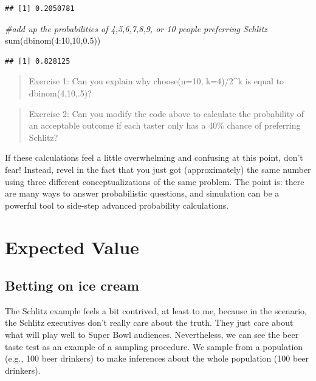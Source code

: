 \documentclass[
  openany]{book}
\newenvironment{Shaded}{\begin{snugshade}}{\end{snugshade}}
\newcommand{\CommentTok}[1]{\textcolor[rgb]{0.56,0.35,0.01}{\textit{#1}}}
\newcommand{\DecValTok}[1]{\textcolor[rgb]{0.00,0.00,0.81}{#1}}
\newcommand{\FloatTok}[1]{\textcolor[rgb]{0.00,0.00,0.81}{#1}}
\newcommand{\FunctionTok}[1]{\textcolor[rgb]{0.00,0.00,0.00}{#1}}
\newcommand{\NormalTok}[1]{#1}
\newcommand{\SpecialCharTok}[1]{\textcolor[rgb]{0.00,0.00,0.00}{#1}}
\begin{document}
\begin{verbatim}
## [1] 0.2050781
\end{verbatim}

\begin{Shaded}
\begin{Highlighting}[]
\CommentTok{\#add up the probabilities of 4,5,6,7,8,9, or 10 people preferring Schlitz}
\FunctionTok{sum}\NormalTok{(}\FunctionTok{dbinom}\NormalTok{(}\DecValTok{4}\SpecialCharTok{:}\DecValTok{10}\NormalTok{,}\DecValTok{10}\NormalTok{,}\FloatTok{0.5}\NormalTok{))}
\end{Highlighting}
\end{Shaded}

\begin{verbatim}
## [1] 0.828125
\end{verbatim}

\begin{quote}
Exercise 1: Can you explain why choose(n=10, k=4)/2\^{}k is equal to dbinom(4,10,.5)?
\end{quote}

\begin{quote}
Exercise 2: Can you modify the code above to calculate the probability of an acceptable outcome if each taster only has a 40\% chance of preferring Schlitz?
\end{quote}

If these calculations feel a little overwhelming and confusing at this point, don't fear! Instead, revel in the fact that you just got (approximately) the same number using three different conceptualizations of the same problem. The point is: there are many ways to answer probabilistic questions, and simulation can be a powerful tool to side-step advanced probability calculations.

\hypertarget{expected-value}{%
\chapter{Expected Value}\label{expected-value}}

\hypertarget{betting-on-ice-cream}{%
\section*{Betting on ice cream}\label{betting-on-ice-cream}}

The Schlitz example feels a bit contrived, at least to me, because in the scenario, the Schlitz executives don't really care about the truth. They just care about what will play well to Super Bowl audiences. Nevertheless, we can see the beer taste test as an example of a sampling procedure. We sample from a population (e.g., 100 beer drinkers) to make inferences about the whole population (100 beer drinkers).
\end{document}
